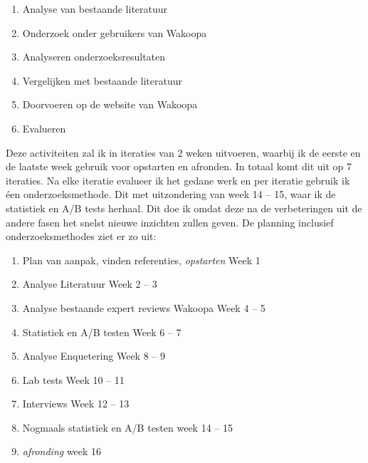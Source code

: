 \documentclass[a4paper, 10pt, pdftex]{article}
\begin{document}
\begin{enumerate}
\item
Analyse van bestaande literatuur
\item
Onderzoek onder gebruikers van Wakoopa
\item
Analyseren onderzoeksresultaten
\item
Vergelijken met bestaande literatuur
\item
Doorvoeren op de website van Wakoopa
\item
Evalueren
\end{enumerate}

Deze activiteiten zal ik in iteraties van 2 weken uitvoeren, waarbij ik de eerste en de laatste week gebruik voor opstarten en afronden. In totaal komt dit uit op 7 iteraties. Na elke iteratie evalueer ik het gedane werk en per iteratie gebruik ik éen onderzoeksmethode. Dit met uitzondering van week 14 -- 15, waar ik de statistiek en A/B tests herhaal. Dit doe ik omdat deze na de verbeteringen uit de andere fasen het snelst nieuwe inzichten zullen geven. De planning inclusief onderzoeksmethodes ziet er zo uit:

\begin{flushleft}
  \begin{enumerate}
    \item Plan van aanpak, vinden referenties, \emph{opstarten}
      \linebreak Week 1
    \item Analyse Literatuur
      \linebreak Week 2 -- 3
    \item Analyse bestaande expert reviews Wakoopa
      \linebreak Week 4 -- 5
    \item Statistiek en A/B testen
      \linebreak Week 6 -- 7
    \item Analyse Enquetering
      \linebreak Week 8 -- 9
    \item Lab tests
      \linebreak Week 10 -- 11
    \item Interviews
      \linebreak Week 12 -- 13
    \item Nogmaals statistiek en A/B testen
      \linebreak week 14 -- 15
    \item \emph{afronding}
      \linebreak week 16
  \end{enumerate}
\end{flushleft}
\end{document}
